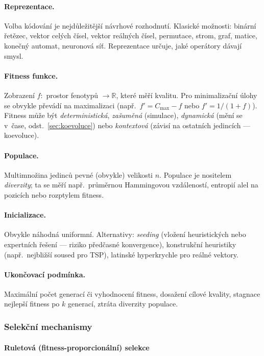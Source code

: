 \documentclass[11pt,a4paper]{article}
\theoremstyle{definition}
\begin{document}
\paragraph{Reprezentace.} Volba kódování je nejdůležitější návrhové rozhodnutí.
Klasické možnosti: binární řetězec, vektor celých čísel, vektor reálných čísel,
permutace, strom, graf, matice, konečný automat, neuronová síť. Reprezentace
určuje, jaké operátory dávají smysl.

\paragraph{Fitness funkce.} Zobrazení $f:$ prostor fenotypů $\to \mathbb{R}$,
které měří kvalitu. Pro minimalizační úlohy se obvykle převádí na maximalizaci
(např.\ $f' = C_{\max} - f$ nebo $f' = 1/(1+f)$). Fitness může být
\emph{deterministická}, \emph{zašuměná} (simulace), \emph{dynamická}
(mění se v~čase, odst.~\ref{sec:koevoluce}) nebo \emph{kontextová}
(závisí na ostatních jedincích --- koevoluce).

\paragraph{Populace.} Multimnožina jedinců pevné (obvykle) velikosti $n$.
Populace je nositelem \emph{diverzity}; ta se měří např.\ průměrnou Hammingovou
vzdáleností, entropií alel na pozicích nebo rozptylem fitness.

\paragraph{Inicializace.} Obvykle náhodná uniformní. Alternativy: \emph{seeding}
(vložení heuristických nebo expertních řešení --- riziko předčasné konvergence),
konstrukční heuristiky (např.\ nejbližší soused pro TSP), latinské
hyperkrychle pro reálné vektory.

\paragraph{Ukončovací podmínka.} Maximální počet generací či vyhodnocení
fitness, dosažení cílové kvality, stagnace nejlepší fitness po $k$ generací,
ztráta diverzity populace.

\subsubsection{Selekční mechanismy}\label{ssec:selekce}

\paragraph{Ruletová (fitness-proporcionální) selekce}
\end{document}
